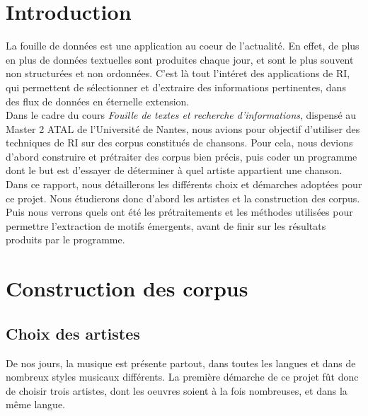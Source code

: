 \documentclass[a4paper]{article}
\begin{document}
	

	\section*{Introduction}
	
	La fouille de données est une application au coeur de l'actualité. En effet, de plus en plus de données textuelles sont produites chaque jour, et sont le plus souvent non structurées et non ordonnées. C'est là tout l'intéret des applications de RI, qui permettent de sélectionner et d'extraire des informations pertinentes, dans des flux de données en éternelle extension.\\
	
	Dans le cadre du cours \textit{Fouille de textes et recherche d’informations}, dispensé au Master 2 ATAL de l'Université de Nantes, nous avions pour objectif d'utiliser des techniques de RI sur des corpus constitués de chansons. Pour cela, nous devions d'abord construire et prétraiter des corpus bien précis, puis coder un programme dont le but est d'essayer de déterminer à quel artiste appartient une chanson.\\
	
	Dans ce rapport, nous détaillerons les différents choix et démarches adoptées pour ce projet. Nous étudierons donc d'abord les artistes et la construction des corpus. Puis nous verrons quels ont été les prétraitements et les méthodes utilisées pour permettre l'extraction de motifs émergents, avant de finir sur les résultats produits par le programme.

	\section{Construction des corpus}
	
	\subsection{Choix des artistes}
	
	De nos jours, la musique est présente partout, dans toutes les langues et dans de nombreux styles musicaux différents. La première démarche de ce projet fût donc de choisir trois artistes, dont les oeuvres soient à la fois nombreuses, et dans la même langue. \\
	
\end{document}
